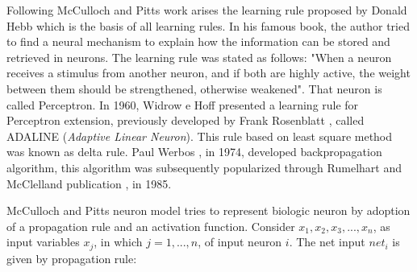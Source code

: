 Following McCulloch and Pitts work arises the learning rule proposed by Donald Hebb \cite{hebb1949organization} which is the basis of all learning rules. In his famous book, the author tried to find a neural mechanism to explain how the information can be stored and retrieved in neurons. The learning rule was stated as follows: "When a neuron receives a stimulus from another neuron, and if both are highly active, the weight between them should be strengthened, otherwise weakened". That neuron is called Perceptron. In 1960, Widrow e Hoff \cite{widrow1960adaptive} presented a learning rule for Perceptron extension, previously developed by Frank Rosenblatt \cite{rosenblatt1960perceptron}, called ADALINE (\textit{Adaptive Linear Neuron}). This rule based on least square method was known as delta rule. Paul Werbos \cite{Werbos74}, in 1974, developed backpropagation algorithm, this algorithm was subsequently popularized through Rumelhart and McClelland publication \cite{rumelhart1985learning}, in 1985.

McCulloch and Pitts neuron model tries to represent biologic neuron by adoption of a propagation rule and an activation function. Consider $x_1, x_2, x_3, ..., x_n$, as input variables $x_j$, in which $j = 1,...,n$, of input neuron $i$. The net input $net_i$ is given by propagation rule:

